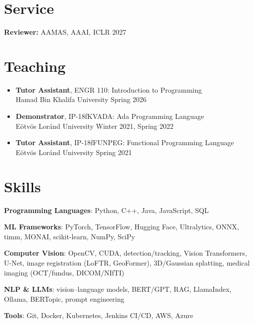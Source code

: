 \documentclass[11pt]{article}
\begin{document}
\section{Service}
\textbf{Reviewer:} AAMAS, AAAI, ICLR \hfill 2027\par

\section{Teaching}
\begin{itemize}
  \item \textbf{Tutor Assistant}, ENGR 110: Introduction to Programming\\
        Hamad Bin Khalifa University \hfill Spring 2026
  \item \textbf{Demonstrator}, IP-18fKVADA: Ada Programming Language\\
        Eötvös Loránd University \hfill Winter 2021, Spring 2022
  \item \textbf{Tutor Assistant}, IP-18fFUNPEG: Functional Programming Language\\
        Eötvös Loránd University \hfill Spring 2021
\end{itemize}

\section{Skills}
{\raggedright
\textbf{Programming Languages}: Python, C++, Java, JavaScript, SQL\par
\textbf{ML Frameworks}: PyTorch, TensorFlow, Hugging Face, Ultralytics, ONNX, timm, MONAI, scikit-learn, NumPy, SciPy\par
\textbf{Computer Vision}: OpenCV, CUDA, detection/tracking, Vision Transformers, U-Net, image registration (LoFTR, GeoFormer),
3D/Gaussian splatting, medical imaging (OCT/fundus, DICOM/NIfTI)\par
\textbf{NLP \& LLMs}: vision--language models, BERT/GPT, RAG, LlamaIndex, Ollama, BERTopic, prompt engineering\par
\textbf{Tools}: Git, Docker, Kubernetes, Jenkins CI/CD, AWS, Azure\par}
\end{document}
